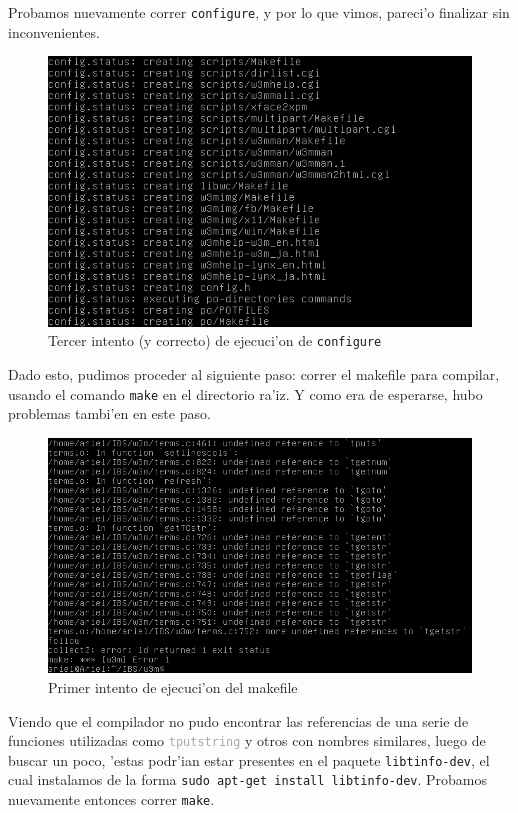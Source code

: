\documentclass[11pt]{article}
\begin{document}
	Probamos nuevamente correr \texttt{configure}, y por lo que vimos, pareci'o finalizar sin inconvenientes.
	
	\begin{figure}[H]
		\centering \captionsetup{justification=centering}
		\includegraphics[width=.8\linewidth]{Images/Compile_w3m/configure_successful}
		\caption{Tercer intento (y correcto) de ejecuci'on de \texttt{configure}}
	\end{figure}
	
	Dado esto, pudimos proceder al siguiente paso: correr el makefile para compilar, usando el comando \texttt{make} en el directorio ra'iz. Y como era de esperarse, hubo problemas tambi'en en este paso.
	
	\begin{figure}[H]
		\centering \captionsetup{justification=centering}
		\includegraphics[width=.8\linewidth]{Images/Compile_w3m/libtinfo-dev_missing}
		\caption{Primer intento de ejecuci'on del makefile}
	\end{figure}
	
	Viendo que el compilador no pudo encontrar las referencias de una serie de funciones utilizadas como \texttt{\textcolor{darkgray}{tputstring}} y otros con nombres similares, luego de buscar un poco, 'estas podr'ian estar presentes en el paquete \texttt{libtinfo-dev}, el cual instalamos de la forma \texttt{sudo apt-get install libtinfo-dev}. Probamos nuevamente entonces correr \texttt{make}.
	
\end{document}
